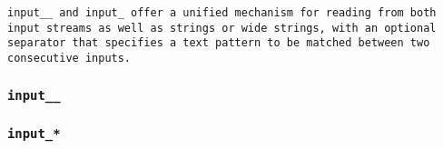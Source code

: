 \tt{input__} and \tt{input_} offer a unified mechanism for reading from both
input streams as well as strings or wide strings, with an optional separator
that specifies a text pattern to be matched between two consecutive inputs.

\subsubsection{\tt{input__}}


\subsubsection{\tt{input_}*}

